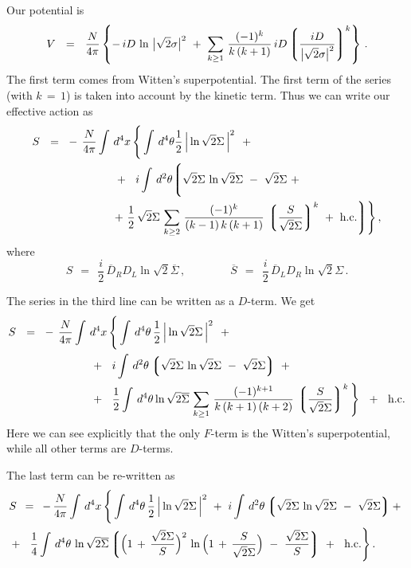 \documentclass[epsfig,12pt]{article}
\def\beq{\begin{equation}}
\def\eeq{\end{equation}}
\newcommand{\ov}{\overline}
\newcommand{\lgr}{\left\lgroup}
\newcommand{\rgr}{\right\rgroup}
\begin{document}
	Our potential is
\beq
	V    ~~=~~    \frac{N}{4\pi} 
	\left\{
		-\,iD\, \ln\, \big|\sqrt{2}\sigma\big|^2 ~+~
		\sum_{k \geq 1}\, \frac{(-1)^k} 
                                      { k\,(k + 1) }\, iD \lgr \frac{ iD } 
                                                       { \big|\sqrt{2}\sigma\big|^2 } \rgr^k 
	\right\}\,.
\eeq
	The first term comes from Witten's superpotential.
	The first term of the series (with $ k \,=\, 1 $) is taken into account by the kinetic term.
	Thus we can write our effective action as
\begin{align}
%
\notag
	S    ~~=~~ &    -\, \frac{N}{4\pi} \int\, d^4x\,
			\Bigg\{
			\int\, d^4\theta \frac{1}{2}\, \Big| \ln \sqrt{2}\Sigma \, \Big|^2
			~~+~~
	\\
%
        & 
			\qquad\quad~~
			~~+~~ i \int\, d^2\theta 
			\Biggl\lgroup
			\sqrt{2}\Sigma\, \ln \sqrt{2}\Sigma  ~-~ \sqrt{2}\Sigma
			~+~ 
			\Biggr.
	\\
%
\notag
	&
			\qquad\qquad
			\Biggl.
			~+~
			\frac{1}{2}\, \sqrt{2}\Sigma\,
			\sum_{k \geq 2}\, \frac{    (-1)^k    }
                                             {  (k - 1)\,k\,(k + 1)  }\, \lgr \frac{S}{\sqrt{2}\Sigma} \rgr^k
			~+~ \text{h.c.}
			\Biggr\rgroup
			\Bigg\}\,,
\end{align}
	where
\beq
	S    ~~=~~    \frac{i}{2}\,\ov D{}_R D_L \ln \sqrt{2}\ov\Sigma\,,
	\qquad\qquad
	\ov S    ~~=~~    \frac{i}{2}\, \ov D{}_L D_R \ln \sqrt{2}\Sigma\,.
\eeq

	The series in the third line can be written as a $ D $-term.
	We get
\begin{align}
%
\notag
	S    ~~=~~ &    -\, \frac{N}{4\pi} \int\, d^4x\,
			\Bigg\{
			\int\, d^4\theta\, \frac{1}{2}\, \Big| \ln \sqrt{2}\Sigma \, \Big|^2
			~~+~~
	\\
%
        & 
			\qquad\quad~~
			~~+~~ i \int\, d^2\theta 
			\lgr \sqrt{2}\Sigma\, \ln \sqrt{2}\Sigma  ~-~ \sqrt{2}\Sigma \rgr
			~+~ 
	\\
%
\notag
	&
			\qquad\quad~~
			~~+~~ 
			\frac{1}{2} \int\, d^4\theta
			\ln \sqrt{2}\ov\Sigma\,
			\sum_{k \geq 1}\, \frac{    (-1)^{k + 1}    }
                                              {  k\,(k + 1)\,(k + 2)  }\, \lgr \frac{S}{\sqrt{2}\Sigma} \rgr^k
			\Bigg\} 
	~~+~~ \text{h.c.}
\end{align}
	Here we can see explicitly that the only $ F $-term is the Witten's superpotential,
	while all other terms are $ D $-terms.

	The last term can be re-written as
\begin{align}
%
\notag
	& S    \,~=~\,      -\, \frac{N}{4\pi} \int\, d^4x\,
			\Bigg\{
			\int\, d^4\theta\, \frac{1}{2}\, \Big| \ln \sqrt{2}\Sigma \, \Big|^2
			~+~ 
			i \int\, d^2\theta 
			\lgr \sqrt{2}\Sigma\, \ln \sqrt{2}\Sigma  ~-~ \sqrt{2}\Sigma \rgr
			+~ 
	\\
%
			&
			+~~ 
			\frac{1}{4} \int\, d^4\theta\,
			\ln \sqrt{2}\ov\Sigma\,
			\biggl\lgroup
				\Big( 1 \,+\, \frac{\sqrt{2}\Sigma}{S} \Big)^2\,
				\ln \Big( 1 \,+\, \frac{S}{\sqrt{2}\Sigma} \Big)
				~-~ 
				\frac{\sqrt{2}\Sigma}{S}
			\biggr\rgroup
			~+~~ \text{h.c.}
			\Bigg\}\,.
\end{align}
\end{document}
